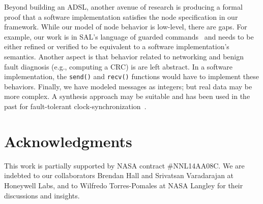 \documentclass{llncs/llncs}
\newcommand{\lee}[1]{ } %
\newcommand{\lee}[1]{ {\color{blue}$<$lee: #1$>$} } %
\begin{document}
Beyond building an ADSL, another avenue of research is producing a formal proof that a software implementation satisfies the node specification in our framework. While our model of node behavior is low-level, there are gaps. For example, our work is in SAL's language of guarded commands~\cite{} and needs to be either refined or verified to be equivalent to a software implementation's semantics. Another aspect is that behavior related to networking and benign fault diagnosis (e.g., computing a CRC) is are left abstract. In a software implementation, the \texttt{send()} and \texttt{recv()} functions would have to implement these behaviors. Finally, we have modeled messages as integers; but real data may be more complex. A synthesis approach may be suitable and has been used in the past for fault-tolerant clock-synchronization~\cite{ddd}.



\lee{link to all results in github}
\lee{talk about compositional verification of properties, even though SAL doesn't directly support it---maybe not so important}
\lee{talk about k-induction vs. PDR---actually I don't think we have much to say}
\lee{talk about lack of axiomatization in model-checking (multiple rushby bugs), but  tradeoff of deadlock. see proglema paper}

\section*{Acknowledgments}
This work is partially supported by NASA contract \#NNL14AA08C. We are indebted to our collaborators Brendan Hall and Srivatsan Varadarajan at Honeywell Labs, and to Wilfredo Torres-Pomales at NASA Langley for their discussions and insights.



\end{document}
